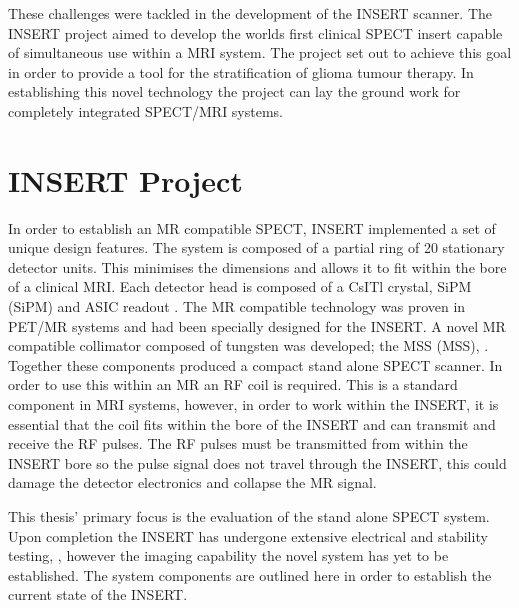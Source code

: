 These challenges were tackled in the development of the \acrshort{INSERT} scanner. The \acrshort{INSERT} project aimed to develop the worlds first clinical \acrshort{SPECT} insert capable of simultaneous use within a \acrshort{MRI} system. The project set out to achieve this goal in order to provide a tool for the stratification of glioma tumour therapy. In establishing this novel technology the project can lay the ground work for completely integrated \acrshort{SPECT/MRI} systems.

\section{INSERT Project}

In order to establish an \acrshort{MR} compatible \acrshort{SPECT}, \acrshort{INSERT} implemented a set of unique design features. The system is composed of a partial ring of 20 stationary detector units. This minimises the dimensions and allows it to fit within the bore of a clinical \acrshort{MRI}. Each detector head is composed of a \acrshort{CsITl} crystal, \acrlong{SiPM} (\acrshort{SiPM}) and ASIC readout \cite{Trigilio2018AApplications}. The \acrshort{MR} compatible technology was proven in \acrshort{PET/MR} systems and had been specially designed for the \acrshort{INSERT}. A novel \acrshort{MR} compatible collimator composed of tungsten was developed; the \acrlong{MSS} (\acrshort{MSS}), \cite{7430894}. Together these components produced a compact stand alone \acrshort{SPECT} scanner. In order to use this within an \acrshort{MR} an \acrlong{RF} coil is required. This is a standard component in \acrshort{MRI} systems, however, in order to work within the \acrshort{INSERT}, it is essential that the coil fits within the bore of the \acrshort{INSERT} and can transmit and receive the \acrshort{RF} pulses. The \acrshort{RF} pulses must be transmitted from within the \acrshort{INSERT} bore so the pulse signal does not travel through the \acrshort{INSERT}, this could damage the detector electronics and collapse the \acrshort{MR} signal.

This thesis' primary focus is the evaluation of the stand alone \acrshort{SPECT} system. Upon completion the \acrshort{INSERT} has undergone extensive electrical and stability testing, \cite{8432104}, however the imaging capability the novel system has yet to be established. The system components are outlined here in order to establish the current state of the \acrshort{INSERT}.

